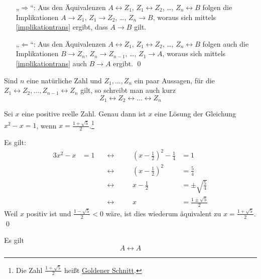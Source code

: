 \begin{bew}[*]
    \begin{enumerate}
        \item[„$\Rightarrow$“:] Aus den Äquivalenzen $A\leftrightarrow Z_1$, $Z_1\leftrightarrow Z_2$, \dots, $Z_n\leftrightarrow B$ folgen die Implikationen $A\to Z_1$, $Z_1\to Z_2$, \dots, $Z_n\to B$, woraus sich mittels \cref{implikationtrans} ergibt, dass $A\to B$ gilt.
        \item[„$\Leftarrow$“:] Aus den Äquivalenzen $A\leftrightarrow Z_1$, $Z_1\leftrightarrow Z_2$, \dots, $Z_n\leftrightarrow B$ folgen auch die Implikationen $B\to Z_n$, $Z_n\to Z_{n-1}$, \dots, $Z_1\to A$, woraus sich mittels \cref{implikationtrans} auch $B\to A$ ergibt. \qed
    \end{enumerate}
\end{bew}


\begin{nota}
    Sind $n$ eine natürliche Zahl und $Z_1,\dots , Z_n$ ein paar Aussagen, für die $Z_1\leftrightarrow Z_2,\dots, Z_{n-1}\leftrightarrow Z_n$ gilt, so schreibt man auch kurz
    \[ Z_1\leftrightarrow Z_2 \leftrightarrow \ldots \leftrightarrow  Z_n\]
\end{nota}


\begin{bsp}
    Sei $x$ eine positive reelle Zahl. Genau dann ist $x$ eine Lösung der Gleichung $x^2-x=1$, wenn $x= \frac{1+\sqrt{5}}{2}$.\footnote{Die Zahl $\frac{1+\sqrt{5}}{2}$ heißt \href{https://de.wikipedia.org/wiki/Goldener_Schnitt}{Goldener Schnitt}.}
\end{bsp}


\begin{bew}
    Es gilt:
    \begin{alignat*}{3}
        x^2-x& =1 \quad&\leftrightarrow\quad&& \left(x-\frac{1}{2}\right)^2 - \frac{1}{4} &= 1 \\
        && \leftrightarrow\quad&& \left(x-\frac{1}{2}\right)^2&=\frac{5}{4} \\
        && \leftrightarrow\quad&& x-\frac{1}{2} &= \pm \sqrt{\frac{5}{4}} \\
        && \leftrightarrow\quad&& x  &= \frac{1\pm \sqrt{5}}{2} 
    \end{alignat*}
    Weil $x$ positiv ist und $\frac{1-\sqrt{5}}{2}<0$ wäre, ist dies wiederum äquivalent zu $x=\frac{1+\sqrt{5}}{2}$. \qed
\end{bew}


\begin{satz}\label{iffref}
    Es gilt
        \[ A\leftrightarrow A \]
\end{satz}



